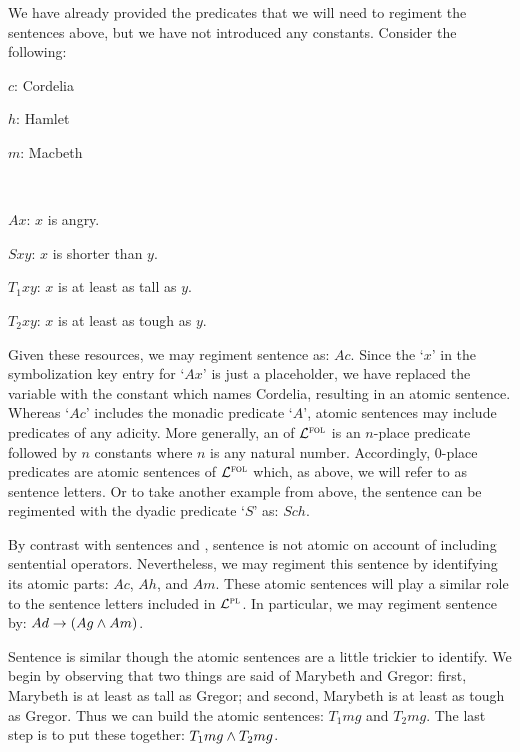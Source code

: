 We have already provided the predicates that we will need to regiment the sentences above, but we have not introduced any constants.
Consider the following:

\begin{ekey}
  \begin{multicols}{2}
    \item[$c$:] Cordelia
    \item[$h$:] Hamlet
    \item[$m$:] Macbeth
    \item[] ~
    \item[$Ax$:] $x$ is angry. 
    \item[$Sxy$:] $x$ is shorter than $y$. 
    \item[$T_1xy$:] $x$ is at least as tall as $y$. 
    \item[$T_2xy$:] $x$ is at least as tough as $y$. 
  \end{multicols}
\end{ekey}

Given these resources, we may regiment sentence  as: $Ac$.
Since the `$x$' in the symbolization key entry for `$Ax$' is just a placeholder, we have replaced the variable with the constant which names Cordelia, resulting in an atomic sentence.
Whereas `$Ac$' includes the monadic predicate `$A$', atomic sentences may include predicates of any adicity.
More generally, an  of $\mathcal{L}^{\textsc{fol}}$ is an $n$-place predicate followed by $n$ constants where $n$ is any natural number.
Accordingly, $0$-place predicates are atomic sentences of $\mathcal{L}^{\textsc{fol}}$ which, as above, we will refer to as sentence letters.
Or to take another example from above, the sentence  can be regimented with the dyadic predicate `$S$' as: $Sch$.

By contrast with sentences  and , sentence  is not atomic on account of including sentential operators.
Nevertheless, we may regiment this sentence by identifying its atomic parts: $Ac$, $Ah$, and $Am$.
These atomic sentences will play a similar role to the sentence letters included in $\mathcal{L}^{\textsc{pl}}$.
In particular, we may regiment sentence  by: $Ad \rightarrow (Ag \wedge Am)$.

Sentence  is similar though the atomic sentences are a little trickier to identify.
We begin by observing that two things are said of Marybeth and Gregor: first, Marybeth is at least as tall as Gregor; and second, Marybeth is at least as tough as Gregor.
Thus we can build the atomic sentences: $T_1mg$ and $T_2mg$. 
The last step is to put these together: $T_1mg \wedge T_2mg$.





